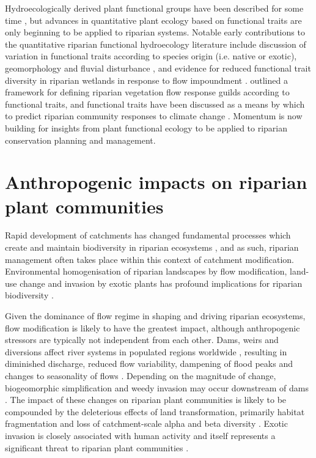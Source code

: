 \documentclass[12pt,a4paper]{memoir}
\begin{document}
Hydroecologically derived plant functional groups have been described for some time \citep{Stromberg2010, Casanova2011}, but advances in quantitative plant ecology based on functional traits are only beginning to be applied to riparian systems. Notable early contributions to the quantitative riparian functional hydroecology literature include discussion of variation in functional traits according to species origin (i.e. native or exotic), geomorphology and fluvial disturbance \citep{Kyle2009, Kyle2009a}, and evidence for reduced functional trait diversity in riparian wetlands in response to flow impoundment \citep{Catford2011}. \citet{Merritt2010b} outlined a framework for defining riparian vegetation flow response guilds according to functional traits, and functional traits have been discussed as a means by which to predict riparian community responses to climate change \citep{Catford2012a, Kominoski2013}. Momentum is now building for insights from plant functional ecology to be applied to riparian conservation planning and management.

\section{Anthropogenic impacts on riparian plant communities}
Rapid development of catchments has changed fundamental processes which create and maintain biodiversity in riparian ecosystems \citep{Nilsson2002}, and as such, riparian management often takes place within this context of catchment modification. Environmental homogenisation of riparian landscapes by flow modification, land-use change and invasion by exotic plants has profound implications for riparian biodiversity \citep{Brierley1999, Richardson2007, poff2007homogenization}. 

Given the dominance of flow regime in shaping and driving riparian ecosystems, flow modification is likely to have the greatest impact, although anthropogenic stressors are typically not independent from each other. Dams, weirs and diversions affect river systems in populated regions worldwide \citep{Nilsson2002}, resulting in diminished discharge, reduced flow variability, dampening of flood peaks and changes to seasonality of flows \citep{Graf2006, Singer2007}. Depending on the magnitude of change, biogeomorphic simplification and weedy invasion may occur downstream of dams \citep{Graf2006, Naiman2008, Catford2011}. The impact of these changes on riparian plant communities is likely to be compounded by the deleterious effects of land transformation, primarily habitat fragmentation and loss of catchment-scale alpha and beta diversity \citep{Vitousek1997, Gerstner2014}. Exotic invasion is closely associated with human activity \citep{Vitousek1996} and itself represents a significant threat to riparian plant communities \citep{Richardson2007, Stromberg2007}.
\end{document}
